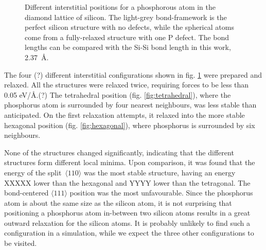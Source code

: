 \documentclass[11pt,bibliography=totoc,index=totoc]{scrbook}   %
\begin{document}
\begin{figure}[htbp]
{  }
  \caption{Different interstitial positions for a phosphorous atom in the diamond lattice of silicon. 
  The light-grey bond-framework is the perfect silicon structure with no defects, 
  while the spherical atoms come from a fully-relaxed structure with one P defect. 
  The bond lengths can be compared with the Si-Si bond length in this work, 2.37~Å. }
  \label{fig:interstitial_positions}
\end{figure}


The four (?) different interstitial configurations shown in fig. \ref{fig:interstitial_positions} were prepared and relaxed.
All the structures were relaxed twice, requiring forces to be less than 0.05 eV/Å.(?)
The tetrahedral position (fig. \ref{fig:tetrahedral}), where the phosphorus atom is surrounded by four nearest neighbours, 
was less stable than anticipated.
On the first relaxation attempts, it relaxed into the more stable hexagonal position (fig. \ref{fig:hexagonal}), where 
phosphorus is surrounded by six neighbours.

None of the structures changed significantly, indicating that the different structures form different local minima.
Upon comparison, it was found that the energy of the split~$\langle110\rangle$ was the most stable structure,
having an energy XXXXX lower than the hexagonal and YYYY lower than the tetragonal. The bond-centered $\langle 111 \rangle$
position was the most unfavourable. Since the phosphorus atom is about the same size as the silicon atom, it is not surprising that positioning a phosphorus atom in-between two silicon atoms results in a great outward relaxation for the silicon atoms. 
It is probably unlikely to find such a configuration in a simulation, while we expect the three other configurations to be visited.
\end{document}
